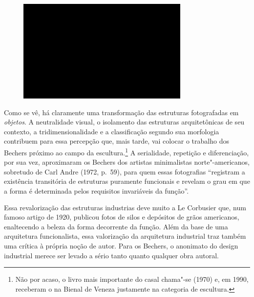 \begin{figure}[!ht]
\centering
 \includegraphics[width=85mm]{./imgs/im1.jpg}
\caption{\tiny{}}
\end{figure}

Como se vê, há claramente uma transformação das estruturas fotografadas %
em \emph{objetos}. A neutralidade visual, o isolamento das estruturas
arquitetônicas de seu contexto, a tridimensionalidade e a classificação
segundo sua morfologia contribuem para essa percepção que, mais tarde,
vai colocar o trabalho dos Bechers próximo ao campo da
escultura.\footnote{Não por acaso, o livro mais importante do casal
  chama"-se {} (1970) e, em 1990, receberam o
  {} na Bienal de Veneza justamente na categoria de
  escultura.} A serialidade, repetição e diferenciação, por sua vez,
aproximaram os Bechers dos artistas minimalistas norte"-americanos,
sobretudo de Carl Andre (1972, p.~59), para quem essas fotografias ``registram a
existência transitória de estruturas puramente funcionais e revelam o
grau em que a forma é determinada pelos requisitos invariáveis da
função''.

Essa revalorização das estruturas industrias deve muito a Le Corbusier
que, num famoso artigo de 1920, publicou fotos de silos e depósitos de
grãos americanos, enaltecendo a beleza da forma decorrente da função.
Além da base de uma arquitetura funcionalista, essa valorização da
arquitetura industrial traz também uma crítica à própria noção de autor.
Para os Bechers, o anonimato do design industrial merece ser levado a
sério tanto quanto qualquer obra autoral.


